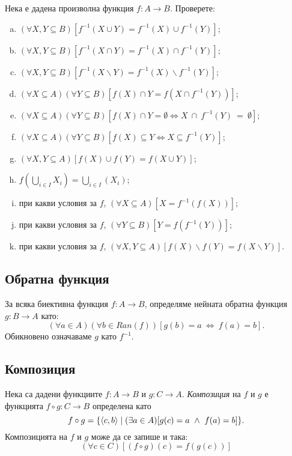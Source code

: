\begin{problem}
  Нека е дадена произволна функция $f:A \to B$.
  Проверете:
  \begin{enumerate}[a)]
  \item
    $(\forall X,Y \subseteq B)[f^{-1}(X\cup Y) = f^{-1}(X)\cup f^{-1}(Y)]$;
  \item
    $(\forall X,Y \subseteq B)[f^{-1}(X\cap Y) = f^{-1}(X)\cap f^{-1}(Y)]$;
  \item
    $(\forall X,Y \subseteq B)[f^{-1}(X\backslash Y) = f^{-1}(X)\backslash f^{-1}(Y)]$;
  \item
    $(\forall X\subseteq A)(\forall Y\subseteq B)[f(X)\cap Y = f(X\cap f^{-1}(Y))]$;
  \item
    $(\forall X \subseteq A)(\forall Y \subseteq B)[f(X)\cap Y = \emptyset \iff  X~\cap~f^{-1}(Y)~=~\emptyset]$;
  \item
    $(\forall X \subseteq A)(\forall Y \subseteq B)[f(X)\subseteq Y \iff X\subseteq f^{-1}(Y)]$;
  \item
    $(\forall X,Y \subseteq A)[f(X)\cup f(Y) = f(X\cup Y)]$;
  \item
    $f(\bigcup_{i\in I}X_i) = \bigcup_{i\in I}(X_i)$;
  \item
    при какви условия за $f$,
    $(\forall X\subseteq A)[X =  f^{-1}(f(X))]$;
  \item
    при какви условия за $f$,
    $(\forall Y \subseteq B)[Y = f(f^{-1}(Y))]$;
  \item
    при какви условия за $f$,
    $(\forall X,Y \subseteq A)[f(X)\backslash f(Y) = f(X\backslash Y)]$.
  \end{enumerate}
\end{problem}

\newpage

\subsection*{Обратна функция}

За всяка биективна функция $f:A\to B$, определяме нейната обратна функция $g:B \to  A$ като:
\[(\forall a \in A)(\forall b \in Ran(f))[g(b) = a\ \iff\ f(a) = b].\]
Обикновено означаваме $g$ като $f^{-1}$.

\subsection*{Композиция}

Нека са дадени функциите $f:A\to B$ и $g:C\to A$.
{\em Композиция} на $f$ и $g$ е функцията $f\circ g: C \to B$ определена като
\[f\circ g = \{\langle{c,b}\rangle\mid (\exists a\in A)[g(c) = a\ \wedge\ f(a) = b]\}.\]
Композицията на $f$ и $g$ може да се запише и така:
\[(\forall c\in C)[(f\circ g)(c) = f(g(c))]\]

